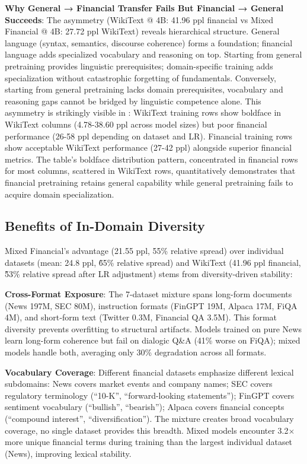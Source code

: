 \textbf{Why General → Financial Transfer Fails But Financial → General Succeeds}: The asymmetry (WikiText @ 4B: 41.96 ppl financial vs Mixed Financial @ 4B: 27.72 ppl WikiText) reveals hierarchical structure. General language (syntax, semantics, discourse coherence) forms a foundation; financial language adds specialized vocabulary and reasoning on top. Starting from general pretraining provides linguistic prerequisites; domain-specific training adds specialization without catastrophic forgetting of fundamentals. Conversely, starting from general pretraining lacks domain prerequisites, vocabulary and reasoning gaps cannot be bridged by linguistic competence alone. This asymmetry is strikingly visible in : WikiText training rows show boldface in WikiText columns (4.78-38.60 ppl across model sizes) but poor financial performance (26-58 ppl depending on dataset and LR). Financial training rows show acceptable WikiText performance (27-42 ppl) alongside superior financial metrics. The table's boldface distribution pattern, concentrated in financial rows for most columns, scattered in WikiText rows, quantitatively demonstrates that financial pretraining retains general capability while general pretraining fails to acquire domain specialization.

\subsection{Benefits of In-Domain Diversity}

Mixed Financial's advantage (21.55 ppl, 55\% relative spread) over individual datasets (mean: 24.8 ppl, \~65\% relative spread) and WikiText (41.96 ppl financial, \~53\% relative spread after LR adjustment) stems from diversity-driven stability:

\textbf{Cross-Format Exposure}: The 7-dataset mixture spans long-form documents (News 197M, SEC 80M), instruction formats (FinGPT 19M, Alpaca 17M, FiQA 4M), and short‑form text (Twitter 0.3M, Financial QA 3.5M). This format diversity prevents overfitting to structural artifacts. Models trained on pure News learn long-form coherence but fail on dialogic Q\&A (41\% worse on FiQA); mixed models handle both, averaging only 30\% degradation across all formats.

\textbf{Vocabulary Coverage}: Different financial datasets emphasize different lexical subdomains: News covers market events and company names; SEC covers regulatory terminology (``10-K'', ``forward-looking statements''); FinGPT covers sentiment vocabulary (``bullish'', ``bearish''); Alpaca covers financial concepts (``compound interest'', ``diversification''). The mixture creates broad vocabulary coverage, no single dataset provides this breadth. Mixed models encounter 3.2$\times$ more unique financial terms during training than the largest individual dataset (News), improving lexical stability.

